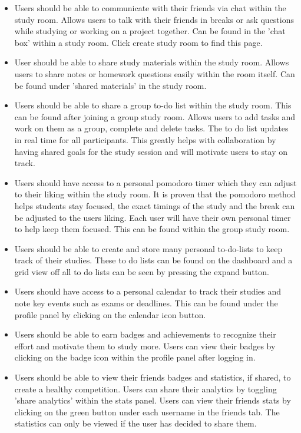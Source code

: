 \begin{itemize}
\item Users should be able to communicate with their friends via chat within the study room. Allows users to talk with their friends in breaks or ask questions while studying or working on a project together. Can be found in the 'chat box' within a study room. Click create study room to find this page.
\item User should be able to share study materials within the study room. Allows users to share notes or homework questions easily within the room itself. Can be found under 'shared materials' in the study room.
\item Users should be able to share a group to-do list within the study room. This can be found after joining a group study room. Allows users to add tasks and work on them as a group, complete and delete tasks. The to do list updates in real time for all participants. This greatly helps with collaboration by having shared goals for the study session and will motivate users to stay on track.
\item Users should have access to a personal pomodoro timer which they can adjust to their liking within the study room. It is proven that the pomodoro method helps students stay focused, the exact timings of the study and the break can be adjusted to the users liking. Each user will have their own personal timer to help keep them focused. This can be found within the group study room.
\item Users should be able to create and store many personal to-do-lists to keep track of their studies. These to do lists can be found on the dashboard and a grid view off all to do lists can be seen by pressing the expand button.
\item Users should have access to a personal calendar to track their studies and note key events such as exams or deadlines. This can be found under the profile panel by clicking on the calendar icon button.
\item Users should be able to earn badges and achievements to recognize their effort and motivate them to study more. Users can view their badges by clicking on the badge icon within the profile panel after logging in.
\item Users should be able to view their friends badges and statistics, if shared, to create a healthy competition. Users can share their analytics by toggling 'share analytics' within the stats panel. Users can view their friends stats by clicking on the green button under each username in the friends tab. The statistics can only be viewed if the user has decided to share them.

\end{itemize}
